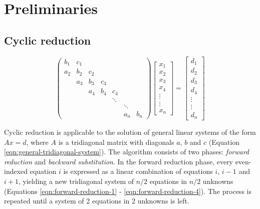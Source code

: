 \documentclass{elsarticle}
\begin{document}
\section{Preliminaries} \label{sec:preliminaries}

\subsection{Cyclic reduction} \label{subsec:cyclic-reduction}

\begin{equation} \label{eqn:general-tridiagonal-system}
\begin{pmatrix}
     b_1 & c_1  \\
     a_2 & b_2  &  c_2  \\
         & a_3  &  b_3 &  c_3  \\
         &      &  a_4 &  b_4 &  c_4  \\
         &      &      &      &  \ddots \\
         &      &      &      &     &  \ddots  \\
         &      &      &      &     &  a_n  &  b_n
\end{pmatrix}
\begin{bmatrix}
    x_1 \\
    x_2 \\
    x_3 \\
    x_4 \\
    \vdots \\
    \vdots \\
    x_n
 \end{bmatrix}
=
\begin{bmatrix}
   d_1 \\
   d_2 \\
   d_3 \\
   d_4 \\
   \vdots \\
   \vdots \\
   d_{n}
\end{bmatrix}
\end{equation}

Cyclic reduction is applicable to the solution of
general linear systems of the form $Ax = d$,
where $A$ is a tridiagonal matrix with diagonals
$a$, $b$ and $c$
(Equation \ref{eqn:general-tridiagonal-system}).
The algorithm consists of two phases:
\emph{forward reduction} and \emph{backward substitution}.
In the forward reduction phase,
every even-indexed equation $i$
is expressed as a
linear combination of equations $i$, $i-1$ and $i+1$,
yielding a new tridiagonal system of
$n/2$ equations in $n/2$ unknowns
(Equations \ref{eqn:forward-reduction-1} - \ref{eqn:forward-reduction-4}).
The process is repeated until a system of
2 equations in 2 unknowns is left.
\end{document}
